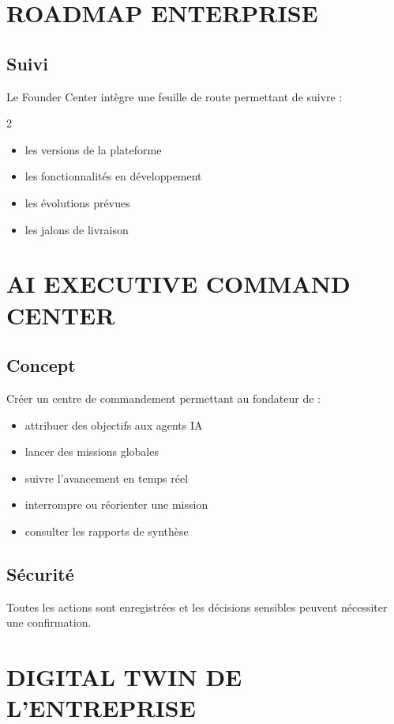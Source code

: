 \documentclass[12pt,a4paper,oneside]{book}
\begin{document}
\chapter{ROADMAP ENTERPRISE}

\section{Suivi}
Le Founder Center intègre une feuille de route permettant de suivre :
\begin{multicols}{2}
\begin{itemize}
\item les versions de la plateforme
\item les fonctionnalités en développement
\item les évolutions prévues
\item les jalons de livraison
\end{itemize}
\end{multicols}

\chapter{AI EXECUTIVE COMMAND CENTER}

\section{Concept}
Créer un centre de commandement permettant au fondateur de :
\begin{itemize}
\item attribuer des objectifs aux agents IA
\item lancer des missions globales
\item suivre l'avancement en temps réel
\item interrompre ou réorienter une mission
\item consulter les rapports de synthèse
\end{itemize}

\section{Sécurité}
Toutes les actions sont enregistrées et les décisions sensibles peuvent nécessiter une confirmation.

\chapter{DIGITAL TWIN DE L'ENTREPRISE}
\end{document}
